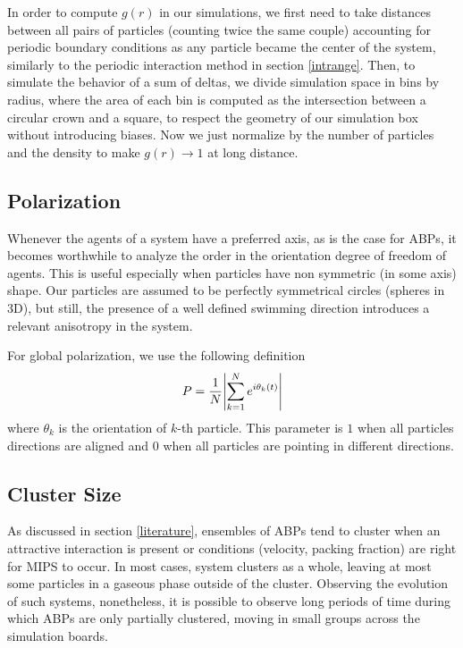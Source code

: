 \documentclass[../../master_thesis_np.tex]{subfiles}
\begin{document}
		In order to compute $g(r)$ in our simulations, we first need to take distances between all pairs of particles (counting twice the same couple) accounting for periodic boundary conditions as any particle became the center of the system, similarly to the periodic interaction method in section \ref{intrange}. 
		Then, to simulate the behavior of a sum of deltas, we divide simulation space in bins by radius, where the area of each bin is computed as the intersection between a circular crown and a square, to respect the geometry of our simulation box without introducing biases. 
		Now we just normalize by the number of particles and the density to make $g(r) \to 1$ at long distance.
		
		\subsection{Polarization}
		Whenever the agents of a system have a preferred axis, as is the case for ABPs, it becomes worthwhile to analyze the order in the orientation degree of freedom of agents. 
		This is useful especially when particles have non symmetric (in some axis) shape. 
		Our particles are assumed to be perfectly symmetrical circles (spheres in 3D), but still, the presence of a well defined swimming direction introduces a relevant anisotropy in the system. 
		
		For global polarization, we use the following definition
		\begin{equation}
			P = \frac{1}{N} \abs{\sum_{k=1}^{N} e^{i \theta_k(t)}} 
		\end{equation}
		where $\theta_k$ is the orientation of $k$-th particle. 
		This parameter is $1$ when all particles directions are aligned and $0$ when all particles are pointing in different directions. 
		
		\subsection{Cluster Size}
		As discussed in section \ref{literature}, ensembles of ABPs tend to cluster when an attractive interaction is present or conditions (velocity, packing fraction) are right for MIPS to occur. 
		In most cases, system clusters as a whole, leaving at most some particles in a gaseous phase outside of the cluster. 
		Observing the evolution of such systems, nonetheless, it is possible to observe long periods of time during which ABPs are only partially clustered, moving in small groups across the simulation boards. 
		
\end{document}
